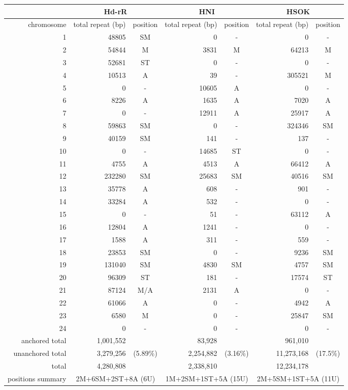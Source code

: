 \begin{tabular}{r|rc|rc|rc}
  \hline
  & \multicolumn{2}{c|}{Hd-rR} & \multicolumn{2}{c|}{HNI} & \multicolumn{2}{c}{HSOK} \\ \hline
  chromosome & total repeat (bp) & position & total repeat (bp) & position & total repeat (bp) & position \\ \hline
  1 & 48805 & SM & 0 & - & 0 & - \\
  2 & 54844 & M & 3831 & M & 64213 & M \\
  3 & 52681 & ST & 0 & - & 0 & - \\
  4 & 10513 & A & 39 & - & 305521 & M \\
  5 & 0 & - & 10605 & A & 0 & - \\
  6 & 8226 & A & 1635 & A & 7020 & A \\
  7 & 0 & - & 12911 & A & 25917 & A \\
  8 & 59863 & SM & 0 & - & 324346 & SM \\
  9 & 40159 & SM & 141 & - & 137 & - \\
  10 & 0 & - & 14685 & ST & 0 & - \\
  11 & 4755 & A & 4513 & A & 66412 & A \\
  12 & 232280 & SM & 25683 & SM & 40516 & SM \\
  13 & 35778 & A & 608 & - & 901 & - \\
  14 & 33284 & A & 532 & - & 0 & - \\
  15 & 0 & - & 51 & - & 63112 & A \\
  16 & 12804 & A & 1241 & - & 0 & - \\
  17 & 1588 & A & 311 & - & 559 & - \\
  18 & 23853 & SM & 0 & - & 9236 & SM \\
  19 & 131040 & SM & 4830 & SM & 4757 & SM \\
  20 & 96309 & ST & 181 & - & 17574 & ST \\
  21 & 87124 & M/A & 2131 & A & 0 & - \\
  22 & 61066 & A & 0 & - & 4942 & A \\
  23 & 6580 & M & 0 & - & 25847 & SM \\
  24 & 0 & - & 0 & - & 0 & - \\
  \hline
  anchored total & 1,001,552 &  & 83,928 &  & 961,010 \\
  unanchored total & 3,279,256 & (5.89\%) & 2,254,882 & (3.16\%) & 11,273,168 & (17.5\%) \\
  total & 4,280,808 &  & 2,338,810 &  & 12,234,178 \\
  \hline
  positions summary & \multicolumn{2}{c|}{2M+6SM+2ST+8A (6U)} & \multicolumn{2}{c|}{1M+2SM+1ST+5A (15U)} & \multicolumn{2}{c}{2M+5SM+1ST+5A (11U)} &
  \hline
\end{tabular}
